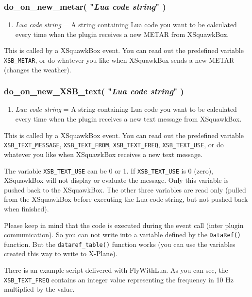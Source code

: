 \documentclass[11pt,parskip=half,a4paper]{scrartcl}
\begin{document}
\subsubsection{do\_on\_new\_metar( "\emph{Lua code string}" )}

\begin{enumerate}
	\item \emph{Lua code string} = A string containing Lua code you want to be calculated every time when the plugin receives a new METAR from XSquawkBox.
\end{enumerate}

This is called by a XSquawkBox event. You can read out the predefined variable \verb|XSB_METAR|, or do whatever you like when XSquawkBox sends a new METAR (changes the weather).


\subsubsection{do\_on\_new\_XSB\_text( "\emph{Lua code string}" )}

\begin{enumerate}
	\item \emph{Lua code string} = A string containing Lua code you want to be calculated every time when the plugin receives a new text message from XSquawkBox.
\end{enumerate}

This is called by a XSquawkBox event. You can read out the predefined variable \verb|XSB_TEXT_MESSAGE|, \verb|XSB_TEXT_FROM|, \verb|XSB_TEXT_FREQ|, \verb|XSB_TEXT_USE|, or do whatever you like when XSquawkBox receives a new text message.

The variable \verb|XSB_TEXT_USE| can be 0 or 1. If \verb|XSB_TEXT_USE| is 0 (zero), XSquawkBox will not display or evaluate the message. Only this variable is pushed back to the XSquawkBox. The other three variables are read only (pulled from the XSquawkBox before executing the Lua code string, but not pushed back when finished).

Please keep in mind that the code is executed during the event call (inter plugin communication). So you can not write into a variable defined by the \verb|DataRef()| function. But the \verb|dataref_table()| function works (you can use the variables created this way to write to X-Plane).

There is an example script delivered with FlyWithLua. As you can see, the \verb|XSB_TEXT_FREQ| contains an integer value representing the frequency in 10 Hz multiplied by the value.
\end{document}
